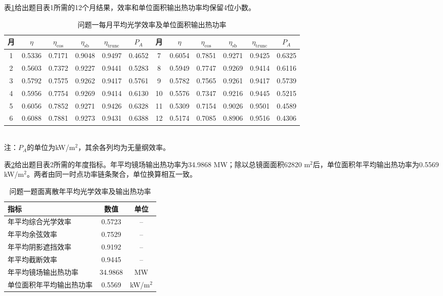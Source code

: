表\ref{tab:q1-monthly}给出题目表1所需的12个月结果，效率和单位面积输出热功率均保留4位小数。

\begin{table}[H]
\centering
\scriptsize
\setlength{\tabcolsep}{2.1pt}
\caption{问题一每月平均光学效率及单位面积输出热功率}
\label{tab:q1-monthly}
\begin{tabular}{c*{5}{c}@{\hspace{5pt}}c*{5}{c}}
\toprule
月 & $\eta$ & $\eta_{\mathrm{cos}}$ & $\eta_{\mathrm{sb}}$ & $\eta_{\mathrm{trunc}}$ & $P_A$
& 月 & $\eta$ & $\eta_{\mathrm{cos}}$ & $\eta_{\mathrm{sb}}$ & $\eta_{\mathrm{trunc}}$ & $P_A$\\
\midrule
1 & 0.5336 & 0.7171 & 0.9048 & 0.9497 & 0.4652 & 7  & 0.6054 & 0.7851 & 0.9271 & 0.9425 & 0.6325\\
2 & 0.5603 & 0.7372 & 0.9227 & 0.9441 & 0.5283 & 8  & 0.5949 & 0.7747 & 0.9269 & 0.9414 & 0.6116\\
3 & 0.5792 & 0.7575 & 0.9262 & 0.9417 & 0.5761 & 9  & 0.5782 & 0.7565 & 0.9261 & 0.9417 & 0.5739\\
4 & 0.5956 & 0.7754 & 0.9269 & 0.9414 & 0.6130 & 10 & 0.5576 & 0.7347 & 0.9216 & 0.9445 & 0.5215\\
5 & 0.6056 & 0.7852 & 0.9271 & 0.9426 & 0.6328 & 11 & 0.5309 & 0.7154 & 0.9026 & 0.9501 & 0.4589\\
6 & 0.6088 & 0.7881 & 0.9273 & 0.9431 & 0.6388 & 12 & 0.5174 & 0.7085 & 0.8906 & 0.9516 & 0.4306\\
\bottomrule
\end{tabular}
\\[2pt]
\footnotesize 注：$P_A$的单位为kW/m$^2$，其余各列均为无量纲效率。
\end{table}

表\ref{tab:q1-annual}给出题目表2所需的年度指标。年平均镜场输出热功率为34.9868 MW；除以总镜面面积62820 m$^2$后，单位面积年平均输出热功率为0.5569 kW/m$^2$。两者由同一时点功率链条聚合，单位换算相互一致。

\begin{table}[H]
\centering
\small
\caption{问题一题面离散年平均光学效率及输出热功率}
\label{tab:q1-annual}
\begin{tabular}{lcc}
\toprule
指标 & 数值 & 单位\\
\midrule
年平均综合光学效率 & 0.5723 & --\\
年平均余弦效率 & 0.7529 & --\\
年平均阴影遮挡效率 & 0.9192 & --\\
年平均截断效率 & 0.9445 & --\\
年平均镜场输出热功率 & 34.9868 & MW\\
单位面积年平均输出热功率 & 0.5569 & kW/m$^2$\\
\bottomrule
\end{tabular}
\end{table}

